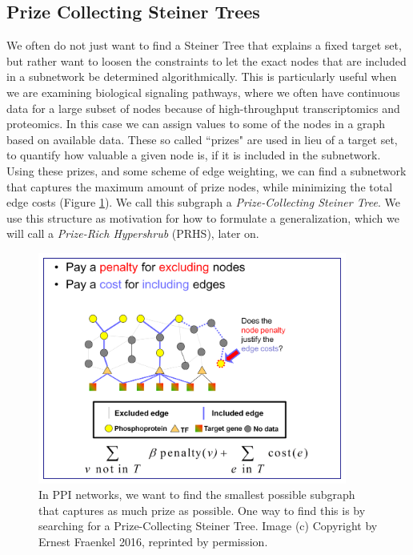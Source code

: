 \documentclass[12pt,twoside]{reedthesis}
\theoremstyle{definition}
\begin{document}
  \subsection{Prize Collecting Steiner Trees}
  We often do not just want to find a Steiner Tree that explains a fixed target set, but rather want to loosen the constraints to let the exact nodes that are included in a subnetwork be determined algorithmically. This is particularly useful when we are examining biological signaling pathways, where we often have continuous data for a large subset of nodes because of high-throughput transcriptomics and proteomics. In this case we can assign values to some of the nodes in a graph based on available data. These so called ``prizes" are used in lieu of a target set, to quantify how valuable a given node is, if it is included in the subnetwork. Using these prizes, and some scheme of edge weighting, we can find a subnetwork that captures the maximum amount of prize nodes, while minimizing the total edge costs (Figure \ref{fig:PCST}). We call this subgraph a \textit{Prize-Collecting Steiner Tree}. We use this structure as motivation for how to formulate a generalization, which we will call a \textit{Prize-Rich Hypershrub} (PRHS), later on.

  \begin{figure}[!h]
    \begin{center}
      \includegraphics[width=4in]{PCST}
    \caption[Prize-Collecting Steiner Tree]{In PPI networks, we want to find the smallest possible subgraph that captures as much prize as possible. One way to find this is by searching for a Prize-Collecting Steiner Tree. Image (c) Copyright by Ernest Fraenkel 2016, reprinted by permission.}
    \label{fig:PCST}
    \end{center}
  \end{figure}
\end{document}
